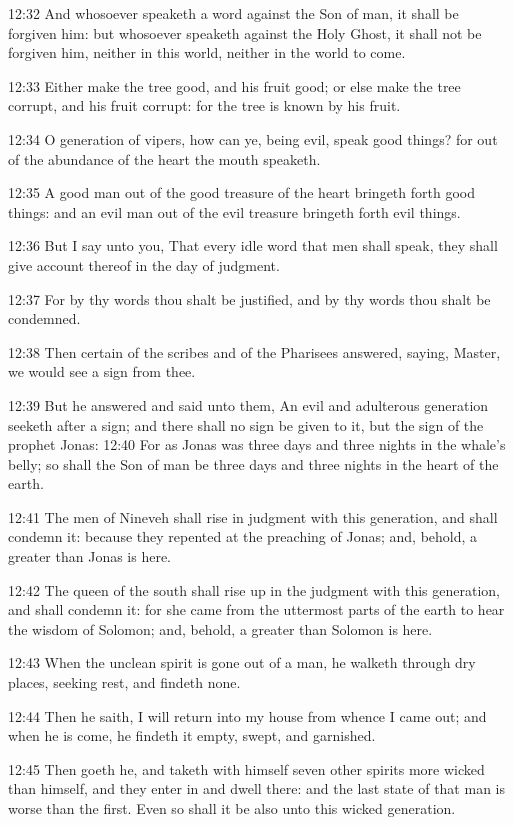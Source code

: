 12:32 And whosoever speaketh a word against the Son of man, it shall be forgiven him: but whosoever speaketh against the Holy Ghost, it shall not be forgiven him, neither in this world, neither in the world to come.

12:33 Either make the tree good, and his fruit good; or else make the tree corrupt, and his fruit corrupt: for the tree is known by his fruit.

12:34 O generation of vipers, how can ye, being evil, speak good things?  for out of the abundance of the heart the mouth speaketh.

12:35 A good man out of the good treasure of the heart bringeth forth good things: and an evil man out of the evil treasure bringeth forth evil things.

12:36 But I say unto you, That every idle word that men shall speak, they shall give account thereof in the day of judgment.

12:37 For by thy words thou shalt be justified, and by thy words thou shalt be condemned.

12:38 Then certain of the scribes and of the Pharisees answered, saying, Master, we would see a sign from thee.

12:39 But he answered and said unto them, An evil and adulterous generation seeketh after a sign; and there shall no sign be given to it, but the sign of the prophet Jonas: 12:40 For as Jonas was three days and three nights in the whale's belly; so shall the Son of man be three days and three nights in the heart of the earth.

12:41 The men of Nineveh shall rise in judgment with this generation, and shall condemn it: because they repented at the preaching of Jonas; and, behold, a greater than Jonas is here.

12:42 The queen of the south shall rise up in the judgment with this generation, and shall condemn it: for she came from the uttermost parts of the earth to hear the wisdom of Solomon; and, behold, a greater than Solomon is here.

12:43 When the unclean spirit is gone out of a man, he walketh through dry places, seeking rest, and findeth none.

12:44 Then he saith, I will return into my house from whence I came out; and when he is come, he findeth it empty, swept, and garnished.

12:45 Then goeth he, and taketh with himself seven other spirits more wicked than himself, and they enter in and dwell there: and the last state of that man is worse than the first. Even so shall it be also unto this wicked generation.

